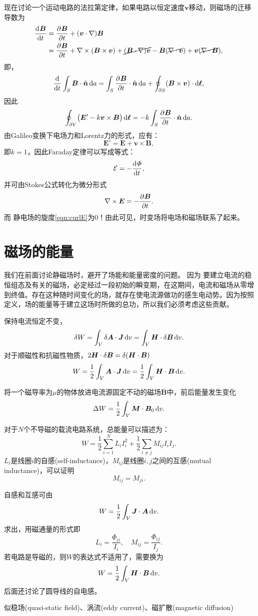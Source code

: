 现在讨论一个运动电路的法拉第定律，如果电路以恒定速度$\bm v$移动，则磁场的迁移导数为
\begin{align*}
    \frac{\mathrm{d}^{{}}\bm B}{\mathrm{d}{t}^{{}}}&=\frac{\partial^{{}}\bm B}{\partial{t}^{{}}}+(\bm v\cdot\nabla)\bm B\\
    &=\frac{\partial^{{}}\bm B}{\partial{t}^{{}}}+\nabla\times(\bm B\times\bm v)+\cancel{(\bm B\cdot\nabla)\bm v}-\bm B(\cancel{\nabla\cdot\bm v})+\bm v(\cancel{\nabla\cdot\bm B}),
\end{align*}
即，
\begin{align*}
    \frac{\mathrm{d}^{{}}}{\mathrm{d}{t}^{{}}}\int_S\bm B\cdot\mathop{}\!\hat{\bm{n}}\mathop{}\!\mathrm{d} a=\int_S\frac{\partial^{{}}\bm B}{\partial{t}^{{}}}\cdot\mathop{}\!\hat{\bm{n}}\mathop{}\!\mathrm{d} a+\oint_{\partial S}(\bm B\times\bm v)\cdot\mathop{}\!\mathrm{d}\bm\ell,
\end{align*}
因此 
\[
    \oint_{\partial V}\bigl(\bm E'-k\bm v\times\bm B\bigr)\mathop{}\!\mathrm{d}\bm\ell=-k\int_S\frac{\partial^{{}}\bm B}{\partial{t}^{{}}}\cdot\mathop{}\!\hat{\bm{n}}\mathop{}\!\mathrm{d} a.
\]
由Galileo变换下电场力和Lorentz力的形式，应有：
\[
    \bm E'=\bm E+\bm v\times\bm B,
\]
即$k=1$，因此Faraday定律可以写成等式：
\begin{equation}
    \label{eqn:Faraday}
    \mathcal{E}=-\frac{\mathrm{d}^{{}}\varPhi}{\mathrm{d}{t}^{{}}},
\end{equation}
并可由Stokes公式转化为微分形式
\begin{equation}
    \label{eqn:curlE-B}
    \nabla\times\bm E=-\frac{\partial^{{}}\bm B}{\partial{t}^{{}}}.
\end{equation}
而%
静电场的旋度\eqref{eqn:curlE}为0！由此可见，时变场将电场和磁场联系了起来。

\section{磁场的能量}
\label{sec:energy in the magnetic field}

我们在前面讨论静磁场时，避开了场能和能量密度的问题。
因为
要建立电流的稳恒组态及有关的磁场，必定经过一段初始的瞬变期，在这期间，电流和磁场从零增到终值。存在这种随时间变化的场，就存在使电流源做功的感生电动势。因为按照定义，场的能量等于建立这场时所做的总功，所以我们必须考虑这些贡献。

保持电流恒定不变，
\[
    \mathop{}\!\delta W=\int_V\mathop{}\!\delta\bm A\cdot\bm J\mathop{}\!\mathrm{d} v=\int_V\bm H\cdot\mathop{}\!\delta\bm B\mathop{}\!\mathrm{d} v.
\]
对于顺磁性和抗磁性物质，$2\bm H\cdot\mathop{}\!\delta\bm B=\mathop{}\!\delta(\bm H\cdot\bm B)$
\[
    W=\frac12\int_V\bm A\cdot\bm J\mathop{}\!\mathrm{d} v=\frac12\int_V\bm H\cdot\bm B\mathop{}\!\mathrm{d} v.
\]

将一个磁导率为$\mu$的物体放进电流源固定不动的磁场$\bm B$中，前后能量发生变化
\[
    \Delta W=\frac12\int_V\bm M\cdot\bm B_0\mathop{}\!\mathrm{d} v.
\]

\label{ssec:self- and mutual inductance}

对于$N$个不导磁的载流电路系统，总能量可以描述为：
\[
    W=\frac12\sum_{i=1}^NL_iI_i^2+\frac12\sum_{i\neq j}M_{ij}I_iI_j.
\]
$L_i$是线圈$i$的自感(self-inductance)，$M_{ij}$是线圈$i,j$之间的互感(mutual inductance)，可以证明 
\[
    M_{ij}=M_{ji}.
\]

自感和互感可由
\[
    W=\frac12\int_V\bm J\cdot\bm A\mathop{}\!\mathrm{d} v.
\]
求出，用磁通量的形式即
\[
    L_i=\frac{\varPhi_{ii}}{I_i},\quad M_{ij}=\frac{\varPhi_{ij}}{I_j}.
\]
若电路是导磁的，则$W$的表达式不适用了，需要换为
\[
    W=\frac12\int_V\bm H\cdot\bm B\mathop{}\!\mathrm{d} v.
\]
后面还讨论了圆导线的自电感。

\label{sec:quasi-static field}

似稳场(quasi-static field)、涡流(eddy current)、磁扩散(magnetic diffusion)

